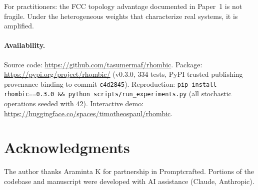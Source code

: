 \documentclass[11pt]{article}
\begin{document}
For practitioners: the FCC topology advantage documented in
Paper~1 is not fragile. Under the heterogeneous weights that
characterize real systems, it is amplified.

\paragraph{Availability.}
\begin{sloppypar}
Source code: \url{https://github.com/tasumermaf/rhombic}.
Package: \url{https://pypi.org/project/rhombic/} (v0.3.0, 334 tests,
PyPI trusted publishing provenance binding to commit
\texttt{c4d2845}).
Reproduction: \texttt{pip install rhombic==0.3.0 \&\& python
scripts/run\_experiments.py} (all stochastic operations seeded with 42).
Interactive demo: \url{https://huggingface.co/spaces/timotheospaul/rhombic}.
\end{sloppypar}

\section*{Acknowledgments}

The author thanks Araminta K for partnership in Promptcrafted.
Portions of the codebase and manuscript were developed with AI
assistance (Claude, Anthropic).



\end{document}
